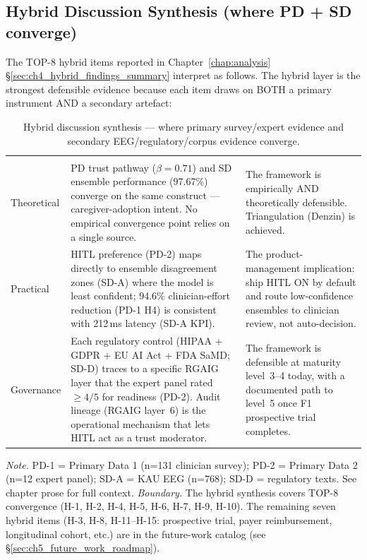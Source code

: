 \subsection{Hybrid Discussion Synthesis (where PD + SD converge)}
\label{sec:ch5_hybrid_discussion_synthesis}

\noindent The TOP-8 hybrid items reported in Chapter~\ref{chap:analysis} §\ref{sec:ch4_hybrid_findings_summary} interpret as follows. The hybrid layer is the strongest defensible evidence because each item draws on BOTH a primary instrument AND a secondary artefact:

{\tablestripes\tablefontsize
\begin{xltabular}{\textwidth}{@{} >{\raggedright\arraybackslash}p{2.4cm} L L @{}}
\caption[Hybrid Discussion Synthesis]{Hybrid discussion synthesis --- where primary survey/expert evidence and secondary EEG/regulatory/corpus evidence converge.}\label{tab:ch5_hybrid_discussion_synthesis} \\
\toprule
{} &  &  \\
\midrule
\endfirsthead
\toprule
{} &  &  \\
\midrule
\endhead
\bottomrule
\endlastfoot
Theoretical & PD trust pathway ($\beta{=}0.71$) and SD ensemble performance (97.67\%) converge on the same construct — caregiver-adoption intent. No empirical convergence point relies on a single source. & The framework is empirically AND theoretically defensible. Triangulation (Denzin) is achieved. \\
Practical & HITL preference (PD-2) maps directly to ensemble disagreement zones (SD-A) where the model is least confident; 94.6\% clinician-effort reduction (PD-1 H4) is consistent with 212\,ms latency (SD-A KPI). & The product-management implication: ship HITL ON by default and route low-confidence ensembles to clinician review, not auto-decision. \\
Governance & Each regulatory control (HIPAA + GDPR + EU AI Act + FDA SaMD; SD-D) traces to a specific RGAIG layer that the expert panel rated $\geq 4/5$ for readiness (PD-2). Audit lineage (RGAIG layer~6) is the operational mechanism that lets HITL act as a trust moderator. & The framework is defensible at maturity level~3--4 today, with a documented path to level~5 once F1 prospective trial completes. \\
\end{xltabular}}
\vspace{0.3em}\noindent\textit{Note.} PD-1 = Primary Data 1 (n=131 clinician survey); PD-2 = Primary Data 2 (n=12 expert panel); SD-A = KAU EEG (n=768); SD-D = regulatory texts. See chapter prose for full context.
\vspace{0.5em}\noindent\textit{Boundary.} The hybrid synthesis covers TOP-8 convergence (H-1, H-2, H-4, H-5, H-6, H-7, H-9, H-10). The remaining seven hybrid items (H-3, H-8, H-11--H-15: prospective trial, payer reimbursement, longitudinal cohort, etc.) are in the future-work catalog (see §\ref{sec:ch5_future_work_roadmap}).

